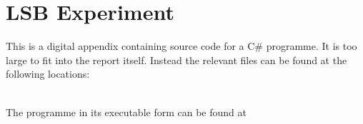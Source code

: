 \chapter{LSB Experiment}
\label{app:A}
This is a digital appendix containing source code for a C\# programme. It is too large to fit into the report itself.
Instead the relevant files can be found at the following locations:

\setlength{\parindent}{0pt} {
 \\

The programme in its executable form can be found at \\
}